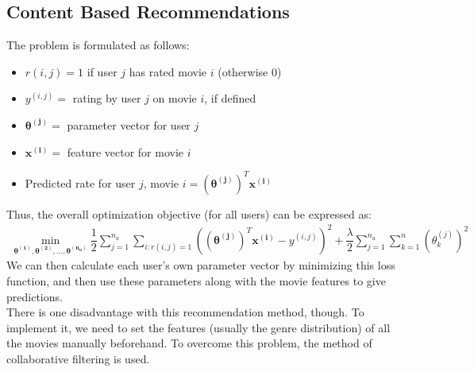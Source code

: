 \documentclass[a4paper, 12pt]{article}
\begin{document}
\subsection{Content Based Recommendations}
The problem is formulated as follows:
\begin{itemize}
\item[] $r\left(i,j\right) = 1$ if user $j$ has rated movie $i$ (otherwise 0)
\item[] $y^{\left(i,j\right)} =$ rating by user $j$ on movie $i$, if defined
\item[] $\bm{\theta^{\left(j\right)}} =$ parameter vector for user $j$
\item[] $\bm{x^{\left(i\right)}} =$ feature vector for movie $i$
\item[] Predicted rate for user $j$, movie $i = \left(\bm{\theta^{\left(j\right)}}\right)^T\bm{x^{\left(i\right)}}$
\end{itemize}
Thus, the overall optimization objective (for all users) can be expressed as:
\begin{align*}
\min_{\bm{\theta^{\left(1\right)}}, \bm{\theta^{\left(2\right)}}, \dots, \bm{\theta^{\left(n_u\right)}}}\dfrac{1}{2}\sum_{j=1}^{n_u}\sum_{i:r(i,j)=1}\left(\left(\bm{\theta^{\left(j\right)}}\right)^T\bm{x^{\left(i\right)}} - y^{\left(i,j\right)}\right)^2 + \dfrac{\lambda}{2}\sum_{j=1}^{n_u}\sum_{k=1}^{n}\left(\theta_k^{(j)}\right)^2
\end{align*}
We can then calculate each user's own parameter vector by minimizing this loss function, and then use these parameters along with the movie features to give predictions. \\
\break
There is one disadvantage with this recommendation method, though. To implement it, we need to set the features (usually the genre distribution) of all the movies manually beforehand. To overcome this problem, the method of collaborative filtering is used.
\end{document}
